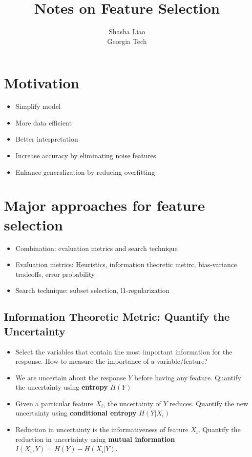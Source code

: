 \documentclass[twoside,12pt]{article}
\begin{document}
\title{Notes on Feature Selection}
\author {Shasha Liao \\ Georgia Tech}
\maketitle
\section{Motivation}
\begin{itemize}
\item Simplify model
\item More data efficient 
\item Better interpretation
\item Increase accuracy by eliminating noise features
\item Enhance generalization by reducing overfitting 
\end{itemize}

\section{Major approaches for feature selection}
\begin{itemize}
\item Combination: evaluation metrics and search technique
\item Evaluation metrics: Heuristics, information theoretic metirc, bias-variance tradeoffs, error probability
\item Search technique: subset selection, l1-regularization 
\end{itemize}

\subsection{Information Theoretic Metric: Quantify the Uncertainty}
\begin{itemize}
\item Select the variables that contain the most important information for the response. How to measure the importance of a variable/feature?
\item We are uncertain about the response $Y$ before having any feature. Quantify the uncertainty using \textbf{entropy} $H(Y)$
\item Given a particular feature $X_i$, the uncertainty of $Y$ reduces. Quantify the new uncertainty using \textbf{conditional entropy} $H(Y|X_i)$
\item Reduction in uncertainty is the informativeness of feature $X_i$. Quantify the reduction in uncertainty using \textbf{mutual information} $I(X_i, Y) = H(Y) - H(X_i | Y)$.
\end{itemize}
\end{document}
